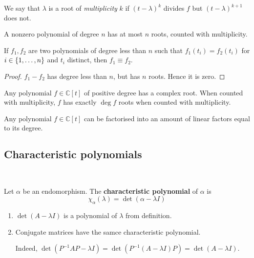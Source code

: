 \documentclass[a4paper,11pt]{article}
\begin{document}
\begin{remark}
	We say that $ \lambda $ is a root of \textit{multiplicity} $ k $ if $ (t-\lambda)^k $ divides $ f $ but $ (t-\lambda)^{k+1} $ does not.
\end{remark}

\begin{corollary}
	A nonzero polynomial of degree $ n $ has at most $ n $ roots, counted with multiplicity.
\end{corollary}
\begin{corollary}
	If $ f_1, f_2 $ are two polynomials of degree less than $ n $ such that $ f_1(t_i) = f_2(t_i) $ for $ i \in \qty{1, \dots, n} $ and $ t_i $ distinct, then $ f_1 \equiv f_2 $.
\end{corollary}
\begin{proof}
	$ f_1 - f_2 $ has degree less than $ n $, but has $ n $ roots.
	Hence it is zero.
\end{proof}

\begin{theorem}
	Any polynomial $ f \in \mathbb C[t] $ of positive degree has a complex root.
	When counted with multiplicity, $ f $ has exactly $ \deg f $ roots when counted with multiplicity. 
\end{theorem}
\begin{corollary}
	Any polynomial $ f \in \mathbb C[t] $ can be factorised into an amount of linear factors equal to its degree.
\end{corollary}

\subsection{Characteristic polynomials}\ \vspace{-1.5em}
\begin{definition}
	Let $ \alpha $ be an endomorphism.
	The \textbf{characteristic polynomial} of $ \alpha $ is
	\[
		\chi_\alpha(\lambda) = \det(\alpha - \lambda I)
	\]
\end{definition}

\begin{remark}
	\begin{enumerate}
		\item $ \det (A-\lambda I) $ is a polynomial of $\lambda$ from definition. 
		\item Conjugate matrices have the samce characteristic polynomial. 
		
		Indeed, $ \det( P^{-1}AP - \lambda I) = \det ( P^{-1}(A-\lambda I)P) = \det(A - \lambda I) $.
	\end{enumerate}
\end{remark}
\end{document}

